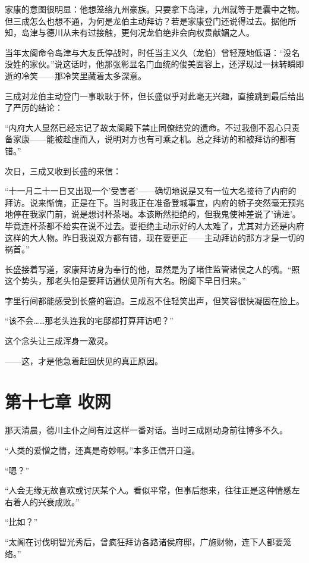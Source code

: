 \documentclass[
]{article}
\begin{document}
家康的意图很明显：他想笼络九州豪族。只要拿下岛津，九州就等于是囊中之物。但三成怎么也想不通，为何是龙伯主动拜访？若是家康登门还说得过去。据他所知，岛津与德川从未有过接触，更何况龙伯绝非会向权贵献媚之人。

当年太阁命令岛津与大友氏停战时，时任当主义久（龙伯）曾轻蔑地低语：``没名没姓的家伙。''说这话时，他那张彰显名门血统的俊美面容上，还浮现过一抹转瞬即逝的冷笑------那冷笑里藏着太多深意。

三成对龙伯主动登门一事耿耿于怀，但长盛似乎对此毫无兴趣，直接跳到最后给出了严厉的结论：

``内府大人显然已经忘记了故太阁殿下禁止同僚结党的遗命。不过我倒不忍心只责备家康------能被趁虚而入，说明对方也有可乘之机。总之拜访的和被拜访的都有错。''

次日，三成又收到长盛的来信：

``十一月二十一日又出现一个'受害者'------确切地说是又有一位大名接待了内府的拜访。说来惭愧，正是在下。当时我正在准备登城事宜，内府的轿子突然毫无预兆地停在我家门前，说是想讨杯茶喝。本该断然拒绝的，但我鬼使神差说了'请进'。毕竟连杯茶都不给实在说不过去。要拒绝主动示好的人太难了，尤其对方还是内府这样的大人物。昨日我说双方都有错，现在要更正------主动拜访的那方才是一切的祸首。''

长盛接着写道，家康拜访身为奉行的他，显然是为了堵住监管诸侯之人的嘴。``照这个势头，那老头怕是要拜访遍伏见所有大名。盼阁下早日归来。''

字里行间都能感受到长盛的窘迫。三成忍不住轻笑出声，但笑容很快凝固在脸上。

``该不会\ldots\ldots 那老头连我的宅邸都打算拜访吧？''

这个念头让三成浑身一激灵。

------这，才是他急着赶回伏见的真正原因。

\section*{第十七章 收网}\label{ux7b2cux5341ux4e03ux7ae0-ux6536ux7f51}

那天清晨，德川主仆之间有过这样一番对话。当时三成刚动身前往博多不久。

``人类的爱憎之情，还真是奇妙啊。''本多正信开口道。

``嗯？''

``人会无缘无故喜欢或讨厌某个人。看似平常，但事后想来，往往正是这种情感左右着人的兴衰成败。''

``比如？''

``太阁在讨伐明智光秀后，曾疯狂拜访各路诸侯府邸，广施财物，连下人都要笼络。''
\end{document}

